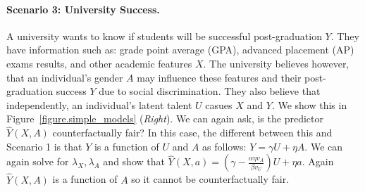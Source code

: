 \paragraph{Scenario 3: University Success.}
A university wants to know if students will be successful post-graduation $Y$. They have information such as: grade point average (GPA), advanced placement (AP) exams results, and other academic features $X$. The university believes however, that an individual's gender $A$ may influence these features and their post-graduation success $Y$ due to social discrimination. They also believe that independently, an individual's latent talent $U$ casues $X$ and $Y$. We show this in Figure~\ref{figure.simple_models} (\emph{Right}). We can again ask, is the predictor $\hat Y(X,A)$ counterfactually fair? In this case, the different between this and Scenario 1 is that $Y$ is a function of $U$ and $A$ as follows: $Y \!=\! \gamma U + \eta A$. We can again solve for $\lambda_X,\lambda_A$ and show that $\hat Y(X,a) \!=\! (\gamma - \frac{\alpha \eta v_A}{\beta v_U})U + \eta a$. Again $\hat Y(X,A)$ is a function of $A$ so it cannot be counterfactually fair.






